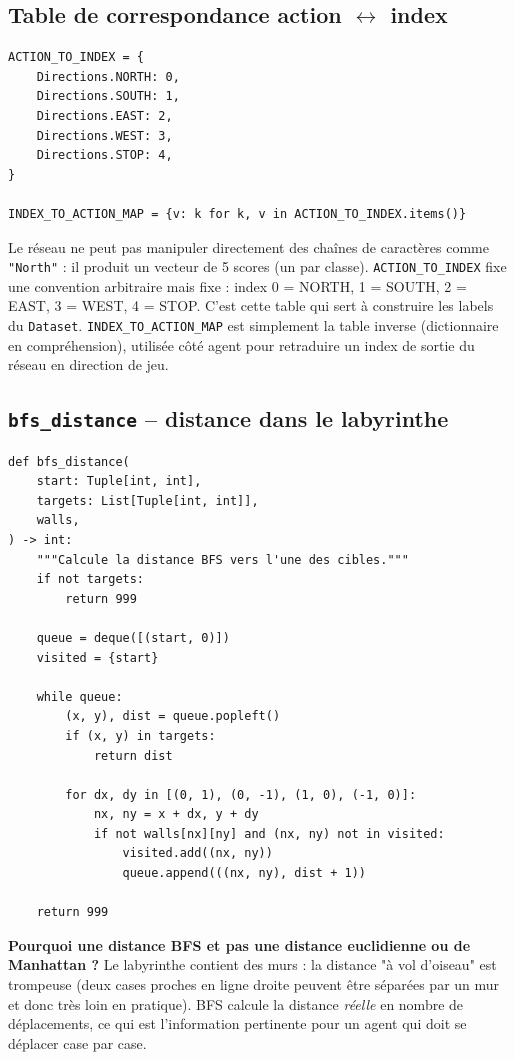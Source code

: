 \documentclass[a4paper,12pt]{article}
\begin{document}
\subsection{Table de correspondance action $\leftrightarrow$ index}

\begin{lstlisting}
ACTION_TO_INDEX = {
    Directions.NORTH: 0,
    Directions.SOUTH: 1,
    Directions.EAST: 2,
    Directions.WEST: 3,
    Directions.STOP: 4,
}

INDEX_TO_ACTION_MAP = {v: k for k, v in ACTION_TO_INDEX.items()}
\end{lstlisting}

Le réseau ne peut pas manipuler directement des chaînes de caractères
comme \texttt{"North"} : il produit un vecteur de 5 scores (un par classe).
\texttt{ACTION\_TO\_INDEX} fixe une convention arbitraire mais fixe :
index 0 = NORTH, 1 = SOUTH, 2 = EAST, 3 = WEST, 4 = STOP. C'est cette
table qui sert à construire les labels du \texttt{Dataset}.
\texttt{INDEX\_TO\_ACTION\_MAP} est simplement la table inverse
(dictionnaire en compréhension), utilisée côté agent pour retraduire un
index de sortie du réseau en direction de jeu.

\subsection{\texttt{bfs\_distance} -- distance dans le labyrinthe}

\begin{lstlisting}
def bfs_distance(
    start: Tuple[int, int],
    targets: List[Tuple[int, int]],
    walls,
) -> int:
    """Calcule la distance BFS vers l'une des cibles."""
    if not targets:
        return 999

    queue = deque([(start, 0)])
    visited = {start}

    while queue:
        (x, y), dist = queue.popleft()
        if (x, y) in targets:
            return dist

        for dx, dy in [(0, 1), (0, -1), (1, 0), (-1, 0)]:
            nx, ny = x + dx, y + dy
            if not walls[nx][ny] and (nx, ny) not in visited:
                visited.add((nx, ny))
                queue.append(((nx, ny), dist + 1))

    return 999
\end{lstlisting}

\textbf{Pourquoi une distance BFS et pas une distance euclidienne ou de
Manhattan ?} Le labyrinthe contient des murs : la distance
"à vol d'oiseau" est trompeuse (deux cases proches en ligne droite peuvent
être séparées par un mur et donc très loin en pratique). BFS calcule la
distance \emph{réelle} en nombre de déplacements, ce qui est l'information
pertinente pour un agent qui doit se déplacer case par case.
\end{document}
